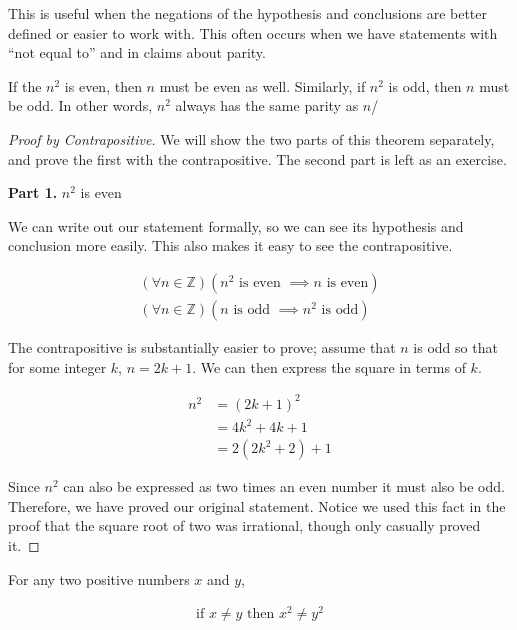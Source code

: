 \documentclass[twoside]{report}
\newcommand{\header}[2]{\begin{flushright} \textbf{#1} #2 \end{flushright}}
\begin{document}
This is useful when the negations of the hypothesis and conclusions are better defined or easier to work with. This often occurs when we have statements with ``not equal to'' and in claims about parity.

\vspace{\baselineskip}
\begin{theorem}
	If the $n^2$ is even, then $n$ must be even as well. Similarly, if $n^2$ is odd, then $n$ must be odd. In other words, $n^2$ always has the same parity as $n$/
\end{theorem}

\begin{proof}[Proof by Contrapositive]
	We will show the two parts of this theorem separately, and prove the first with the contrapositive. The second part is left as an exercise.
	
	\header{Part 1.}{$n^2$ is even}
	We can write out our statement formally, so we can see its hypothesis and conclusion more easily. This also makes it easy to see the contrapositive.
	
	\begin{align*} 
		(\forall n \in \mathbb{Z})(n^2 \text{ is even } \implies n \text{ is even}) \\
		(\forall n \in \mathbb{Z})(n \text{ is odd } \implies n^2 \text{ is odd})
	\end{align*}
	
	The contrapositive is substantially easier to prove; assume that $n$ is odd so that for some integer $k$, $n = 2k + 1$. We can then express the square in terms of $k$.
	
	\begin{align*}
		n^2 &= (2k + 1)^2 \\
		&= 4k^2 + 4k + 1 \\
		&= 2(2k^2 + 2) + 1
	\end{align*}
	
	Since $n^2$ can also be expressed as two times an even number it must also be odd. Therefore, we have proved our original statement. Notice we used this fact in the proof that the square root of two was irrational, though only casually proved it.
\end{proof}

\vspace{\baselineskip}

\begin{theorem}
	For any two positive numbers $x$ and $y$,
	
	\begin{align*}
		\text{if } x \neq y \text{ then } x^2 \neq y^2
	\end{align*}
\end{theorem}
\end{document}
